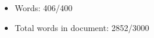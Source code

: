 \documentclass[12pt]{article}
\numberwithin{equation}{section}
\begin{document}
\begin{flushleft}
\begin{itemize}
  \item Words: 406/400
  \item Total words in document: 2852/3000
\end{itemize}


\end{flushleft}
\end{document}
